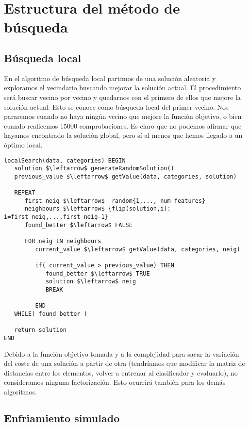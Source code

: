 \documentclass[11pt,leqno]{article}
\begin{document}
\section{Estructura del método de búsqueda}
\subsection{Búsqueda local}
	En el algoritmo de búsqueda local partimos de una solución aleatoria y exploramos el vecindario buscando mejorar la solución actual.
	El procedimiento será buscar vecino por vecino y quedarnos con el primero de ellos que mejore la 
	solución actual. Esto se conoce como búsqueda local del primer vecino. Nos pararemos cuando no haya ningún vecino que mejore la 
	función objetivo, o bien cuando realicemos 15000 comprobaciones. Es claro que no podemos afirmar que hayamos encontrado la
	solución global, pero sí al menos que hemos llegado a un óptimo local.
	
	\begin{lstlisting}[mathescape=true]
localSearch(data, categories) BEGIN
   solution $\leftarrow$ generateRandomSolution()
   previous_value $\leftarrow$ getValue(data, categories, solution)
	
   REPEAT
      first_neig $\leftarrow$  random{1,..., num_features}
      neighbours $\leftarrow$ {flip(solution,i): i=first_neig,...,first_neig-1}
      found_better $\leftarrow$ FALSE
		
      FOR neig IN neighbours
         current_value $\leftarrow$ getValue(data, categories, neig)
			
         if( current_value > previous_value) THEN
            found_better $\leftarrow$ TRUE
            solution $\leftarrow$ neig
            BREAK
		
         END
   WHILE( found_better )
	
   return solution
END
	\end{lstlisting}
	
	Debido a la función objetivo tomada y a la complejidad para sacar la variación del coste de una solución a partir de otra (tendríamos que modificar la matriz de distancias entre los elementos, volver a entrenar al clasificador y evaluarlo), no consideramos ninguna factorización. Esto ocurrirá también para los demás algoritmos.

\subsection{Enfriamiento simulado}
\end{document}

